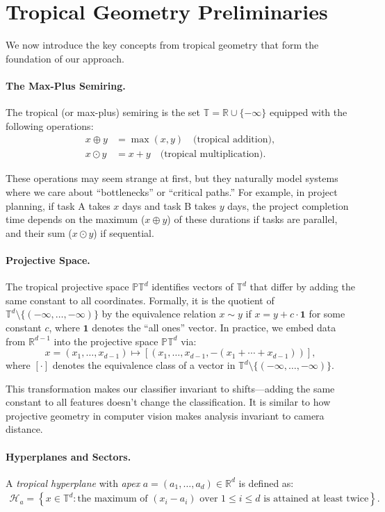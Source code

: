 \documentclass{article}
\renewcommand{\leq}{\leqslant}
\newcommand{\R}{\mathbb{R}}
\newcommand{\trop}{\mathbb{T}}
\newcommand{\proj}{\mathbb{P}}
\begin{document}
\section{Tropical Geometry Preliminaries}\label{sec:prelim}

We now introduce the key concepts from tropical geometry that form the foundation of our approach.

\paragraph{The Max-Plus Semiring.}
The tropical (or max-plus) semiring is the set $\trop = \R \cup \{-\infty\}$
equipped with the following operations:
\begin{align}
x \oplus y &= \max(x,y) \quad \text{(tropical addition)}, \\
x \odot y &= x + y \quad \text{(tropical multiplication)}.
\end{align}

These operations may seem strange at first, but they naturally model systems where we care about ``bottlenecks'' or ``critical paths.'' For example, in project planning, if task A takes $x$ days and task B takes $y$ days, the project completion time depends on the maximum ($x \oplus y$) of these durations if tasks are parallel, and their sum ($x \odot y$) if sequential.

\paragraph{Projective Space.}  
The tropical projective space $\proj \trop^d$ identifies vectors of $\trop^d$ that differ by adding the same constant to all coordinates. Formally, it is the quotient of $\trop^d \setminus \{(-\infty,\dots,-\infty)\}$ by the equivalence relation $x \sim y$ if $x = y + c \cdot \mathbf{1}$ for some constant $c$, where $\mathbf{1}$ denotes the ``all ones'' vector. In practice, we embed data from $\R^{d-1}$ into the projective space $\proj \trop^d$ via:
\[
x=(x_1,\dots,x_{d-1})\mapsto [(x_1,\dots,x_{d-1},-(x_1+\cdots+x_{d-1}))],
\]
where $[\cdot]$ denotes the equivalence class of a vector in  $\trop^d \setminus \{(-\infty,\dots,-\infty)\}$.

This transformation makes our classifier invariant to shifts—adding the same constant to all features doesn't change the classification. It is similar to how projective geometry in computer vision makes analysis invariant to camera distance.

\paragraph{Hyperplanes and Sectors.}
A {\em tropical hyperplane} with {\em apex} $a=(a_1,\dots,a_d) \in \R^d$ is defined as:
\begin{align}
\mathcal{H}_a = \left\{ x \in \trop^d : \text{the maximum of }(x_i - a_i)\text{ over $1\leq i\leq d$ is attained at least twice} \right\}.
\end{align}
\end{document}
